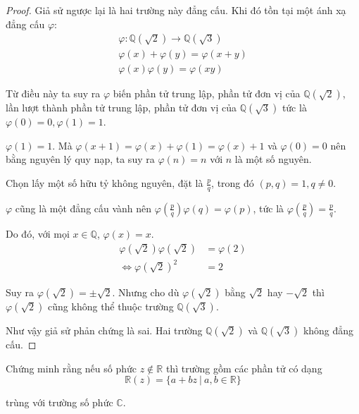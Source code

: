 \documentclass[class=linearalgebra,crop=false]{standalone}
\renewcommand{\phi}{\varphi}
\begin{document}
\begin{proof}Giả sử ngược lại là hai trường này đẳng cấu. Khi đó tồn tại một ánh xạ đẳng cấu $\phi$:
    \begin{gather*}
        \phi: \mathbb{Q}(\sqrt{2})\rightarrow \mathbb{Q}(\sqrt{3}) \\
        \phi(x) + \phi(y) = \phi(x + y) \\
        \phi(x)\phi(y) = \phi(xy)
    \end{gather*}
    \par Từ điều này ta suy ra $\phi$ biến phần tử trung lập, phần tử đơn vị của $\mathbb{Q}(\sqrt{2})$, lần lượt thành phần tử trung lập, phần tử đơn vị của $\mathbb{Q}(\sqrt{3})$ tức là $\phi(0) = 0, \phi(1) = 1$.
    \par $\phi(1) = 1$. Mà $\phi(x + 1) = \phi(x) + \phi(1) = \phi(x) + 1$ và $\phi(0) = 0$ nên bằng nguyên lý quy nạp, ta suy ra $\phi(n) = n$ với $n$ là một số nguyên.
    \bigskip
    \par Chọn lấy một số hữu tỷ không nguyên, đặt là $\frac{p}{q}$, trong đó $(p, q) = 1, q\ne 0$.
    \par $\phi$ cũng là một đẳng cấu vành nên $\phi\left(\frac{p}{q}\right)\phi(q) = \phi(p)$, tức là $\phi(\frac{p}{q}) = \frac{p}{q}$.
    \par Do đó, với mọi $x\in\mathbb{Q}$, $\phi(x) = x$.
    \bigskip
    \begin{align*}
        \phi(\sqrt{2})\phi(\sqrt{2})       & = \phi(2) \\
        \Leftrightarrow \phi(\sqrt{2})^{2} & = 2
    \end{align*}
    \par Suy ra $\phi(\sqrt{2}) = \pm\sqrt{2}$. Nhưng cho dù $\phi(\sqrt{2})$ bằng $\sqrt{2}$ hay $-\sqrt{2}$ thì $\phi(\sqrt{2})$ cũng không thể thuộc trường $\mathbb{Q}(\sqrt{3})$.
    \par Như vậy giả sử phản chứng là sai. Hai trường $\mathbb{Q}(\sqrt{2})$ và $\mathbb{Q}(\sqrt{3})$ không đẳng cấu.
\end{proof}

\begin{exercise}Chứng minh rằng nếu số phức $z\not\in\mathbb{R}$ thì trường gồm các phần tử có dạng
    \[ \mathbb{R}(z) = \{ a + bz\ |\ a, b\in\mathbb{R} \} \]
    \par trùng với trường số phức $\mathbb{C}$.
\end{exercise}
\end{document}
